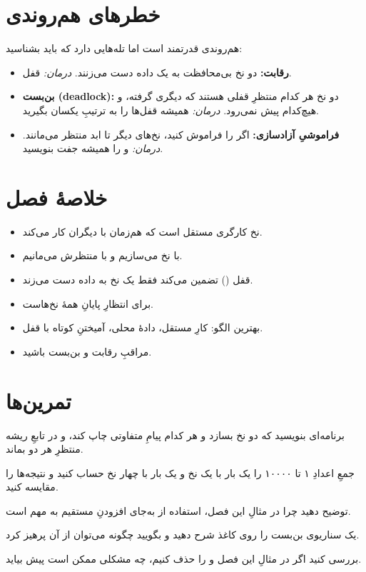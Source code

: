 \section{خطرهای هم‌روندی}

هم‌روندی قدرتمند است اما تله‌هایی دارد که باید بشناسید:
\begin{itemize}
  \item \textbf{رقابت:} دو نخ بی‌محافظت به یک داده دست می‌زنند. \emph{درمان:}
        قفل.
  \item \textbf{بن‌بست (deadlock):} دو نخ هر کدام منتظرِ قفلی هستند که دیگری
        گرفته، و هیچ‌کدام پیش نمی‌رود. \emph{درمان:} همیشه قفل‌ها را به ترتیبِ
        یکسان بگیرید.
  \item \textbf{فراموشیِ آزادسازی:} اگر  را فراموش کنید، نخ‌های
        دیگر تا ابد منتظر می‌مانند. \emph{درمان:}  و 
        را همیشه جفت بنویسید.
\end{itemize}

\section{خلاصهٔ فصل}

\begin{itemize}
  \item نخ کارگری مستقل است که هم‌زمان با دیگران کار می‌کند.
  \item با  نخ می‌سازیم و با  منتظرش می‌مانیم.
  \item قفل () تضمین می‌کند فقط یک نخ به داده دست می‌زند.
  \item {} برای انتظارِ پایانِ همهٔ نخ‌هاست.
  \item بهترین الگو: کارِ مستقل، دادهٔ محلی، آمیختنِ کوتاه با قفل.
  \item مراقبِ رقابت و بن‌بست باشید.
\end{itemize}

\section{تمرین‌ها}

\exercise برنامه‌ای بنویسید که دو نخ بسازد و هر کدام پیامِ متفاوتی چاپ کند، و در
تابعِ ریشه منتظرِ هر دو بماند.

\exercise جمعِ اعدادِ ۱ تا ۱۰۰۰۰ را یک بار با یک نخ و یک بار با چهار نخ حساب
کنید و نتیجه‌ها را مقایسه کنید.

\exercise توضیح دهید چرا در مثالِ این فصل، استفاده از  به‌جای
افزودنِ مستقیم به  مهم است.

\exercise یک سناریوی بن‌بست را روی کاغذ شرح دهید و بگویید چگونه می‌توان از آن
پرهیز کرد.

\exercise بررسی کنید اگر در مثالِ این فصل  و 
را حذف کنیم، چه مشکلی ممکن است پیش بیاید.
